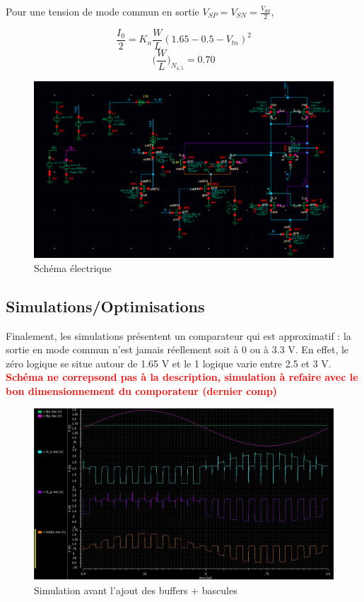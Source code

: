 \documentclass[11pt]{article}
\begin{document}
Pour une tension de mode commun en sortie $V_{SP}=V_{SN} = \frac{V_{dd}}{2}$,

\[
  \frac{I_0}{2} = K_n \frac{W}{L}(1.65-0.5 - V_{tn})^2
\]
\[
  \bigg(\frac{W}{L} \bigg)_{N_{4,5}} = 0.70
\]

\clearpage

\begin{figure}[!htb]
      \centering
      \includegraphics[width=0.9\linewidth]{comparateur_schema_cadence_.png}
      \caption{Sch\'ema \'electrique}
      \label{fig:schcomp}
\end{figure}%


\subsection{Simulations/Optimisations}

Finalement, les simulations pr\'esentent un comparateur qui est approximatif : la sortie en mode
commun n'est jamais r\'eellement soit \`a 0 ou \`a 3.3 V. En effet, le z\'ero logique se situe autour de 1.65 V
et le 1 logique varie entre 2.5 et 3 V. \textbf{\textcolor{red}{Sch\'ema ne correpsond pas \`a la description, simulation
\`a refaire avec le bon dimensionnement du comporateur (dernier comp)}}

\begin{figure}[!htb]
      \centering
      \includegraphics[width=0.8\linewidth]{sim_comp_before_SR_FF.jpg}
      \caption{Simulation avant l'ajout des buffers + bascules}
      \label{fig:sfigBSRFF}
\end{figure}%
\end{document}
